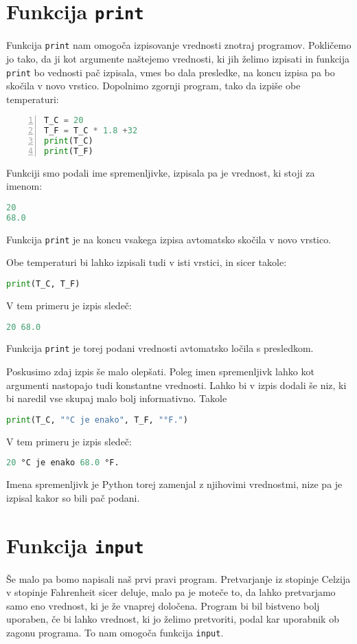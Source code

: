 \section{Funkcija \texttt{print}}
Funkcija \texttt{print} nam omogoča izpisovanje vrednosti znotraj programov. Pokličemo jo tako, da ji kot argumente naštejemo vrednosti, ki jih želimo izpisati in funkcija \texttt{print} bo vednosti pač izpisala, vmes bo dala presledke, na koncu izpisa pa bo skočila v novo vrstico. Dopolnimo zgornji program, tako da izpiše obe temperaturi:
\begin{lstlisting}[language=Python,numbers=left]
T_C = 20
T_F = T_C * 1.8 +32
print(T_C)
print(T_F)
\end{lstlisting}
Funkciji smo podali ime spremenljivke, izpisala pa je vrednost, ki stoji za imenom:
\begin{lstlisting}[language=Python]
20
68.0
\end{lstlisting}
Funkcija \texttt{print} je na koncu vsakega izpisa avtomatsko skočila v novo vrstico.

Obe temperaturi bi lahko izpisali tudi v isti vrstici, in sicer takole:
\begin{lstlisting}[language=Python]
print(T_C, T_F)
\end{lstlisting}
V tem primeru je izpis sledeč:
\begin{lstlisting}[language=Python]
20 68.0
\end{lstlisting}
Funkcija \texttt{print} je torej podani vrednosti avtomatsko ločila s presledkom. 

Poskusimo zdaj izpis še malo olepšati. Poleg imen spremenljivk lahko kot argumenti nastopajo tudi konstantne vrednosti. Lahko bi v izpis dodali še niz, ki bi naredil vse skupaj malo bolj informativno. Takole
\begin{lstlisting}[language=Python]
print(T_C, "°C je enako", T_F, "°F.")
\end{lstlisting}
V tem primeru je izpis sledeč:
\begin{lstlisting}[language=Python]
20 °C je enako 68.0 °F.
\end{lstlisting}
Imena spremenljivk je Python torej zamenjal z njihovimi vrednostmi, nize pa je izpisal kakor so bili pač podani.

\section{Funkcija \texttt{input}}
Še malo pa bomo napisali naš prvi pravi program. Pretvarjanje iz stopinje Celzija v stopinje Fahrenheit sicer deluje, malo pa je moteče to, da lahko pretvarjamo samo eno vrednost, ki je že vnaprej določena. Program bi bil bistveno bolj uporaben, če bi lahko vrednost, ki jo želimo pretvoriti, podal kar uporabnik ob zagonu programa. To nam omogoča funkcija \texttt{input}.

